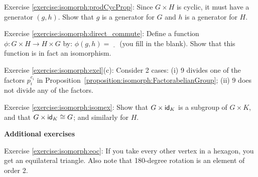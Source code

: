 \noindent Exercise \ref{exercise:isomorph:prodCycProp}: Since $G \times H$ is cyclic, it must have a generator $(g,h)$.  Show that $g$ is a generator for $G$ and $h$ is a generator for $H$.


\noindent Exercise \ref{exercise:isomorph:direct_commute}:
 Define a function $\phi:G \times H \rightarrow H \times G$ by:  $\phi(g,h) = \underline{~~~~}$ (you fill in the blank).  Show that this function is in fact an isomorphism. 

\noindent Exercise \ref{exercise:isomorph:exel}(c): Consider 2 cases: (i) 9 divides one of the factors $p_i^{e_i}$ in Proposition~\ref{proposition:isomorph:FactorabelianGroup}; (ii) 9 does not divide any of the factors.

\noindent Exercise \ref{exercise:isomorph:isomex}:  Show that $G \times {\sf{i}d}_K$ is a subgroup of $G \times K$, and that $G \times {\sf{i}d}_K \cong G$; and similarly for $H$.
\medskip

\textbf{Additional exercises}

\noindent Exercise \ref{exercise:isomorph:eoc}: If you take every other vertex in a hexagon, you get an equilateral triangle. Also note that 180-degree rotation is an element of order 2.

